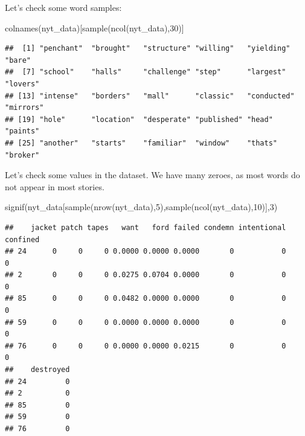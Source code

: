 \documentclass[
]{article}
\newenvironment{Shaded}{\begin{snugshade}}{\end{snugshade}}
\newcommand{\DecValTok}[1]{\textcolor[rgb]{0.00,0.00,0.81}{#1}}
\newcommand{\FunctionTok}[1]{\textcolor[rgb]{0.00,0.00,0.00}{#1}}
\newcommand{\NormalTok}[1]{#1}
\newcommand{\SpecialCharTok}[1]{\textcolor[rgb]{0.00,0.00,0.00}{#1}}
\begin{document}
\begin{Shaded}
\end{Shaded}

Let's check some word samples:

\begin{Shaded}
\begin{Highlighting}[]
\FunctionTok{colnames}\NormalTok{(nyt\_data)[}\FunctionTok{sample}\NormalTok{(}\FunctionTok{ncol}\NormalTok{(nyt\_data),}\DecValTok{30}\NormalTok{)]}
\end{Highlighting}
\end{Shaded}

\begin{verbatim}
##  [1] "penchant"  "brought"   "structure" "willing"   "yielding"  "bare"     
##  [7] "school"    "halls"     "challenge" "step"      "largest"   "lovers"   
## [13] "intense"   "borders"   "mall"      "classic"   "conducted" "mirrors"  
## [19] "hole"      "location"  "desperate" "published" "head"      "paints"   
## [25] "another"   "starts"    "familiar"  "window"    "thats"     "broker"
\end{verbatim}

Let's check some values in the dataset. We have many zeroes, as most
words do not appear in most stories.

\begin{Shaded}
\begin{Highlighting}[]
\FunctionTok{signif}\NormalTok{(nyt\_data[}\FunctionTok{sample}\NormalTok{(}\FunctionTok{nrow}\NormalTok{(nyt\_data),}\DecValTok{5}\NormalTok{),}\FunctionTok{sample}\NormalTok{(}\FunctionTok{ncol}\NormalTok{(nyt\_data),}\DecValTok{10}\NormalTok{)],}\DecValTok{3}\NormalTok{)}
\end{Highlighting}
\end{Shaded}

\begin{verbatim}
##    jacket patch tapes   want   ford failed condemn intentional confined
## 24      0     0     0 0.0000 0.0000 0.0000       0           0        0
## 2       0     0     0 0.0275 0.0704 0.0000       0           0        0
## 85      0     0     0 0.0482 0.0000 0.0000       0           0        0
## 59      0     0     0 0.0000 0.0000 0.0000       0           0        0
## 76      0     0     0 0.0000 0.0000 0.0215       0           0        0
##    destroyed
## 24         0
## 2          0
## 85         0
## 59         0
## 76         0
\end{verbatim}
\end{document}
